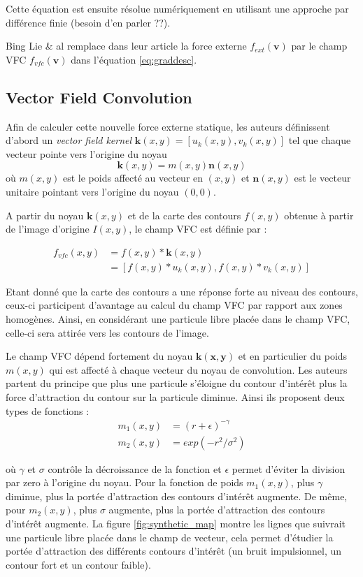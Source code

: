 Cette équation est ensuite résolue numériquement en utilisant une approche par différence finie (besoin d'en parler ??).

Bing Lie \& al remplace dans leur article la force externe $f_{ext}(\mathbf{v})$ par le champ VFC $f_{vfc}(\mathbf{v})$ dans l'équation \ref{eq:graddesc}.

\subsection{Vector Field Convolution}

Afin de calculer cette nouvelle force externe statique, les auteurs définissent d'abord un \textit{vector field kernel} $\mathbf{k}(x,y)=[u_k(x,y),v_k(x,y)]$ tel que chaque vecteur pointe vers l'origine du noyau 
\begin{equation}
	\mathbf{k}(x,y)=m(x,y)\mathbf{n}(x,y)
\end{equation}
où $m(x,y)$ est le poids affecté au vecteur en $(x,y)$ et $\mathbf{n}(x,y)$ est le vecteur unitaire pointant vers l'origine du noyau $(0,0)$.

A partir du noyau $\mathbf{k}(x,y)$ et de la carte des contours $f(x,y)$ obtenue à partir de l'image d'origine $I(x,y)$, le champ VFC est définie par :

\begin{align*}
	f_{vfc}(x,y) & = f(x,y)*\mathbf{k}(x,y) \\
				 & = [f(x,y)*u_k(x,y),f(x,y)*v_k(x,y)]
\end{align*}

Etant donné que la carte des contours a une réponse forte au niveau des contours, ceux-ci participent d'avantage au calcul du champ VFC par rapport aux zones homogènes. Ainsi, en considérant une particule libre placée dans le champ VFC, celle-ci sera attirée vers les contours de l'image. 

Le champ VFC dépend fortement du noyau $\mathbf{k(x,y)}$ et en particulier du poids $m(x,y)$ qui est affecté à chaque vecteur du noyau de convolution. Les auteurs partent du principe que plus une particule s'éloigne du contour d'intérêt plus la force d'attraction du contour sur la particule diminue. Ainsi ils proposent deux types de fonctions :
\begin{align}
	m_1(x,y) & = (r+\epsilon)^{-\gamma} \\
	m_2(x,y) & = exp(-r^2/\sigma^2)
\end{align}

où $\gamma$ et $\sigma$ contrôle la décroissance de la fonction et $\epsilon$ permet d'éviter la division par zero à l'origine du noyau. Pour la fonction de poids $m_1(x,y)$, plus $\gamma$ diminue, plus la portée d'attraction des contours d'intérêt augmente. De même, pour $m_2(x,y)$, plus $\sigma$ augmente, plus la portée d'attraction des contours d'intérêt augmente. La figure \ref{fig:synthetic_map} montre les lignes que suivrait une particule libre placée dans le champ de vecteur, cela permet d'étudier la portée d'attraction des différents contours d'intérêt (un bruit impulsionnel, un contour fort et un contour faible).



